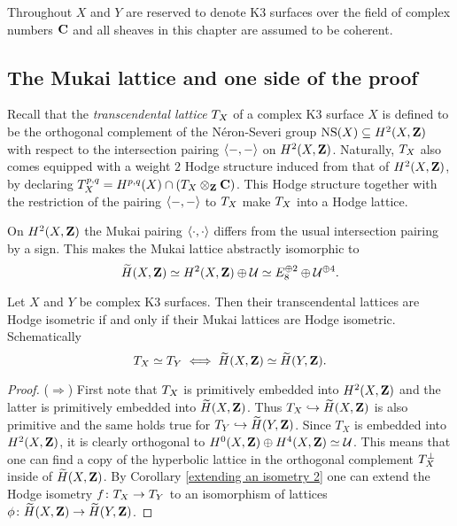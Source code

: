 \vspace{0.3cm}
\noindent
Throughout $X$ and $Y$ are reserved to denote K3 surfaces over the field of complex numbers $\mathbf C$ and all sheaves in this chapter are assumed to be coherent.

\subsection{The Mukai lattice and one side of the proof}

Recall that the \emph{transcendental lattice} $T_{X}$ of a complex K3 surface $X$ is defined to be the orthogonal complement of the Néron-Severi group $\operatorname{NS}(X) \subseteq H^{2}(X, \mathbf Z)$ with respect to the intersection pairing $\langle -, - \rangle$ on $H^{2}(X, \mathbf Z)$.
Naturally, $T_{X}$ also comes equipped with a weight $2$ Hodge structure induced from that of $H^{2}(X, \mathbf Z)$, by declaring $T_{X}^{p,q} = H^{p,q}(X) \cap (T_{X} \otimes_\mathbf Z \mathbf C)$. This Hodge structure together with the restriction of the pairing $\langle -, - \rangle$ to $T_{X}$ make $T_{X}$ into a Hodge lattice.

\begin{remark}
    On $H^{2}(X, \mathbf Z)$ the Mukai pairing $\langle \cdot, \cdot \rangle$ differs from the usual intersection pairing by a sign. This makes the Mukai lattice abstractly isomorphic to
    \[
        \widetilde{H}(X, \mathbf Z) \simeq H^{2}(X, \mathbf Z) \oplus \mathcal U \simeq E_8^{\oplus 2} \oplus \mathcal U^{\oplus 4}.
    \]
\end{remark}

\begin{proposition}
    Let $X$ and $Y$ be complex K3 surfaces. Then their transcendental lattices are Hodge isometric if and only if their Mukai lattices are Hodge isometric. Schematically
    \[
        T_{X} \simeq T_{Y} \iff \widetilde{H}(X, \mathbf Z) \simeq \widetilde{H}(Y, \mathbf Z).
    \]
\end{proposition}

\begin{proof}
    ($\Rightarrow$) First note that $T_{X}$ is primitively embedded into $H^{2}(X, \mathbf Z)$ and the latter is primitively embedded into $\widetilde{H}(X, \mathbf Z)$. Thus $T_X \hookrightarrow \widetilde{H}(X, \mathbf Z)$ is also primitive and the same holds true for $T_Y \hookrightarrow \widetilde{H}(Y, \mathbf Z)$. Since $T_X$ is embedded into $H^{2}(X, \mathbf Z)$, it is clearly orthogonal to $H^0(X, \mathbf Z) \oplus H^4(X, \mathbf Z) \simeq \mathcal U$. This means that one can find a copy of the hyperbolic lattice in the orthogonal complement $T_{X}^\perp$ inside of $\widetilde{H}(X, \mathbf Z)$. By Corollary \ref{extending an isometry 2} one can extend the Hodge isometry $f \colon T_{X} \to T_{Y}$ to an isomorphism of lattices $\phi \colon \widetilde{H}(X, \mathbf Z) \to \widetilde{H}(Y, \mathbf Z)$. 
\end{proof}


